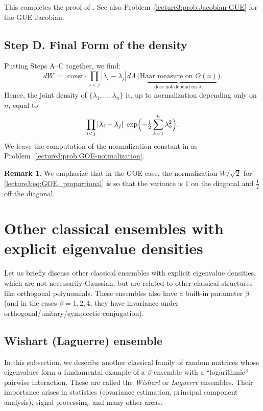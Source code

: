 \documentclass[letterpaper,11pt,oneside,reqno]{book}
\numberwithin{equation}{chapter}  %
\newcommand{\ssp}{\hspace{1pt}}
\theoremstyle{definition}
\newtheorem{remark}[proposition]{Remark}
\begin{document}
This completes the proof of
.
See also Problem~\ref{lecture3:prob:Jacobian-GUE} for the GUE Jacobian.

\subsection{Step D. Final Form of the density}
\label{lecture3:subsec:final-form}

Putting Steps A--C together, we find:
\[
  dW
  \;=\;
	\mathrm{const}\cdot
  \prod_{i<j}|\lambda_i-\lambda_j|\ssp
  d\Lambda
  \,\bigl(\underbrace{\text{Haar measure on }O(n)}_{\text{does not depend on }\lambda_i}\bigr).
\]
Hence, the joint density of \(\{\lambda_1,\dots,\lambda_n\}\) is,
up to normalization depending only on \(n\), equal to
\begin{equation}
	\label{lecture3:eq:GOE_proportional}
  \prod_{i<j}|\lambda_i-\lambda_j|\;
  \exp\Bigl(-\tfrac{1}{2}\sum_{k=1}^n \lambda_k^2\Bigr).
\end{equation}
We leave the computation of the normalization constant in
 as Problem~\ref{lecture3:prob:GOE-normalization}.

\begin{remark}
	We emphasize that in the GOE case, the normalization $W/\sqrt 2$ for
	\eqref{lecture3:eq:GOE_proportional}
	is so that the variance is $1$ on the diagonal and
	$\frac{1}{2}$ off the diagonal.
\end{remark}

\section{Other classical ensembles with explicit eigenvalue densities}
\label{lecture3:sec:other-ensembles}

Let us briefly discuss other classical ensembles with explicit eigenvalue densities,
which are not necessarily Gaussian,
but are related to other classical structures
like orthogonal polynomials. These ensembles
also have
a built-in parameter $\beta$ (and in the cases $\beta=1,2,4$, they have
invariance under orthogonal/unitary/symplectic conjugation).


\subsection{Wishart (Laguerre) ensemble}
\label{lecture3:sec:Wishart}

In this subsection, we describe another classical family of random matrices whose eigenvalues form a fundamental example of a $\beta$-ensemble with a ``logarithmic'' pairwise interaction. These are called the \emph{Wishart} or \emph{Laguerre} ensembles. Their importance arises in statistics (covariance estimation, principal component analysis), signal processing, and many other areas.
\end{document}
